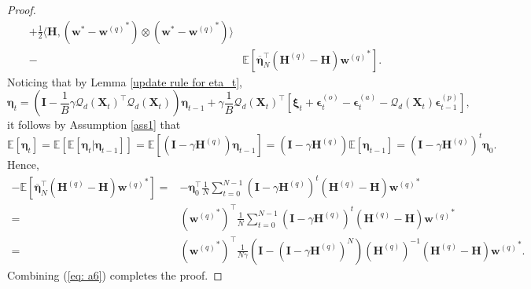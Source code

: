 \documentclass[11pt, letterpaper]{article}
\begin{document}
\begin{proof}
\begin{equation}
\begin{aligned}
            +\frac{1}{2}\langle\mathbf{H},({\mathbf{w}}^*-{\mathbf{w}^{(q)}}^*)\otimes({\mathbf{w}}^*-{\mathbf{w}^{(q)}}^*)\rangle\\
            -&\mathbb{E}\left[\overline{\boldsymbol{\eta}}_N^\top \left(\mathbf{H}^{(q)}-\mathbf{H}\right){\mathbf{w}^{(q)}}^*\right].
        \end{aligned}
    \end{equation}
    Noticing that by Lemma \ref{update rule for eta_t},
    \begin{equation*}
        \boldsymbol{\eta}_t = \left(\mathbf{I}-\frac{1}{B}\gamma {\mathcal{Q}_d(\mathbf{X}_t)}^\top \mathcal{Q}_d(\mathbf{X}_t) \right)\boldsymbol{\eta}_{t-1}+\gamma\frac{1}{B}{\mathcal{Q}_d(\mathbf{X}_t)}^\top \left[\boldsymbol{\xi}_t+\boldsymbol{\epsilon}_t^{(o)}-\boldsymbol{\epsilon}_t^{(a)}-\mathcal{Q}_d(\mathbf{X}_t)\boldsymbol{\epsilon}_{t-1}^{(p)}\right],
    \end{equation*}
    it follows by Assumption \ref{ass1} that
    \begin{equation*}
        \mathbb{E}\left[\boldsymbol{\eta}_t\right]=\mathbb{E}\left[\mathbb{E}\left[\boldsymbol{\eta}_t|\boldsymbol{\eta}_{t-1}\right]\right]=\mathbb{E}\left[\left(\mathbf{I}-\gamma\mathbf{H}^{(q)}\right)\boldsymbol{\eta}_{t-1}\right]=\left(\mathbf{I}-\gamma\mathbf{H}^{(q)}\right)\mathbb{E}\left[\boldsymbol{\eta}_{t-1}\right]=\left(\mathbf{I}-\gamma\mathbf{H}^{(q)}\right)^t\boldsymbol{\eta}_0.
    \end{equation*}
    Hence,
    \begin{equation*}
        \begin{aligned}
            -\mathbb{E}\left[\overline{\boldsymbol{\eta}}_N^\top \left(\mathbf{H}^{(q)}-\mathbf{H}\right){\mathbf{w}^{(q)}}^*\right]=&-\boldsymbol{\eta}_0^\top\frac{1}{N}\sum_{t=0}^{N-1}\left(\mathbf{I}-\gamma\mathbf{H}^{(q)}\right)^t\left(\mathbf{H}^{(q)}-\mathbf{H}\right){\mathbf{w}^{(q)}}^*\\
            =&\left({\mathbf{w}^{(q)}}^*\right)^\top\frac{1}{N}\sum_{t=0}^{N-1}\left(\mathbf{I}-\gamma\mathbf{H}^{(q)}\right)^t\left(\mathbf{H}^{(q)}-\mathbf{H}\right){\mathbf{w}^{(q)}}^*\\
            =&\left({\mathbf{w}^{(q)}}^*\right)^\top\frac{1}{N\gamma}\left(\mathbf{I}-(\mathbf{I}-\gamma\mathbf{H}^{(q)})^N\right)(\mathbf{H}^{(q)})^{-1}\left(\mathbf{H}^{(q)}-\mathbf{H}\right){\mathbf{w}^{(q)}}^*.
        \end{aligned}
    \end{equation*}
    Combining (\ref{eq: a6}) completes the proof.
\end{proof}
\end{document}
